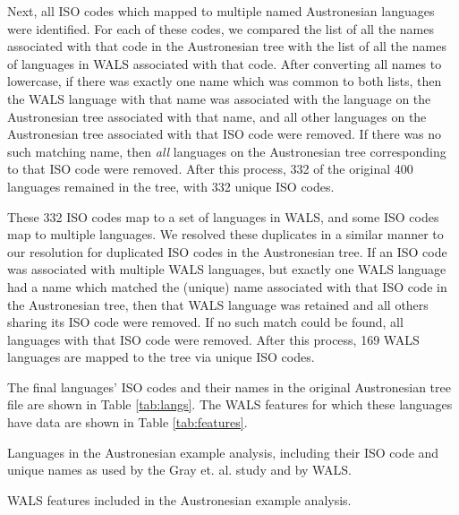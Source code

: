 \documentclass[article,10pt]{scrartcl}
\begin{document}
Next, all ISO codes which mapped to multiple named Austronesian languages were identified.  For each of these codes, we compared the list of all the names associated with that code in the Austronesian tree with the list of all the names of languages in WALS associated with that code.  After converting all names to lowercase, if there was exactly one name which was common to both lists, then the WALS language with that name was associated with the language on the Austronesian tree associated with that name, and all other languages on the Austronesian tree associated with that ISO code were removed.  If there was no such matching name, then \emph{all} languages on the Austronesian tree corresponding to that ISO code were removed.  After this process, 332 of the original 400 languages remained in the tree, with 332 unique ISO codes.

These 332 ISO codes map to a set of languages in WALS, and some ISO codes map to multiple languages.  We resolved these duplicates in a similar manner to our resolution for duplicated ISO codes in the Austronesian tree.  If an ISO code was associated with multiple WALS languages, but exactly one WALS language had a name which matched the (unique) name associated with that ISO code in the Austronesian tree, then that WALS language was retained and all others sharing its ISO code were removed.  If no such match could be found, all languages with that ISO code were removed.  After this process, 169 WALS languages are mapped to the tree via unique ISO codes.

The final languages' ISO codes and their names in the original Austronesian tree file are shown in Table \ref{tab:langs}.  The WALS features for which these languages have data are shown in Table \ref{tab:features}.

\begin{table}[]
	\begin{center}
	\tiny
	
	\end{center}
	\caption{Languages in the Austronesian example analysis, including their ISO code and unique names as used by the Gray et. al. study and by WALS.}
\label{tab:langs}
\end{table}

\begin{table}[ht]
	\begin{center}
		
	\end{center}
\caption{WALS features included in the Austronesian example analysis.}
\label{tab:features}
\end{table}
\end{document}
